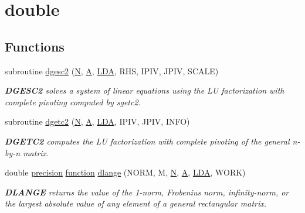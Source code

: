 \hypertarget{group__doubleGEauxiliary}{}\section{double}
\label{group__doubleGEauxiliary}
\subsection*{Functions}
\begin{DoxyCompactItemize}
\item 
subroutine \hyperlink{group__doubleGEauxiliary_gac6998d2ed1a92cc28708602db64f3db6}{dgesc2} (\hyperlink{polmisc_8c_a0240ac851181b84ac374872dc5434ee4}{N}, \hyperlink{classA}{A}, \hyperlink{example__user_8c_ae946da542ce0db94dced19b2ecefd1aa}{L\+D\+A}, R\+H\+S, I\+P\+I\+V, J\+P\+I\+V, S\+C\+A\+L\+E)
\begin{DoxyCompactList}\small\item\em {\bfseries D\+G\+E\+S\+C2} solves a system of linear equations using the L\+U factorization with complete pivoting computed by sgetc2. \end{DoxyCompactList}\item 
subroutine \hyperlink{group__doubleGEauxiliary_ga2ecd51f7842c100d6b4ecc99119c012f}{dgetc2} (\hyperlink{polmisc_8c_a0240ac851181b84ac374872dc5434ee4}{N}, \hyperlink{classA}{A}, \hyperlink{example__user_8c_ae946da542ce0db94dced19b2ecefd1aa}{L\+D\+A}, I\+P\+I\+V, J\+P\+I\+V, I\+N\+F\+O)
\begin{DoxyCompactList}\small\item\em {\bfseries D\+G\+E\+T\+C2} computes the L\+U factorization with complete pivoting of the general n-\/by-\/n matrix. \end{DoxyCompactList}\item 
double \hyperlink{numinquire_8h_a2c8e616467665d0b2814d4c1589ba74e}{precision} \hyperlink{afunc_8m_a7b5e596df91eadea6c537c0825e894a7}{function} \hyperlink{group__doubleGEauxiliary_gaefa80dbd8cd1732740478618b8b622a1}{dlange} (N\+O\+R\+M, M, \hyperlink{polmisc_8c_a0240ac851181b84ac374872dc5434ee4}{N}, \hyperlink{classA}{A}, \hyperlink{example__user_8c_ae946da542ce0db94dced19b2ecefd1aa}{L\+D\+A}, W\+O\+R\+K)
\begin{DoxyCompactList}\small\item\em {\bfseries D\+L\+A\+N\+G\+E} returns the value of the 1-\/norm, Frobenius norm, infinity-\/norm, or the largest absolute value of any element of a general rectangular matrix. \end{DoxyCompactList}\item 

\end{DoxyCompactItemize}
